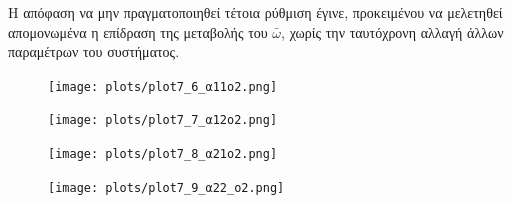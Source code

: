 \documentclass[12pt]{article} %
\numberwithin{equation}{section}  %
\begin{document}
Η απόφαση να μην πραγματοποιηθεί τέτοια ρύθμιση έγινε,  
προκειμένου να μελετηθεί απομονωμένα η επίδραση της μεταβολής του $\bar\omega$, 
χωρίς την ταυτόχρονη αλλαγή άλλων παραμέτρων του συστήματος.


\begin{figure}[ht!]
    \centering
    \begin{minipage}{0.49\textwidth}
        \centering
        \texttt{[image: plots/plot7\_6\_α11o2.png]}
    \end{minipage}
    \hfill
    \begin{minipage}{0.49\textwidth}
        \centering
        \texttt{[image: plots/plot7\_7\_α12o2.png]}
    \end{minipage}
    
    \vspace{1em} %
    
    \centering
    \begin{minipage}{0.49\textwidth}
        \centering
        \texttt{[image: plots/plot7\_8\_α21o2.png]}
    \end{minipage}
    \hfill
    \begin{minipage}{0.49\textwidth}
        \centering
        \texttt{[image: plots/plot7\_9\_α22\_o2.png]}
    \end{minipage}
    
    \caption{}
    \label{fig:A_est_o2}
\end{figure}
\end{document}
